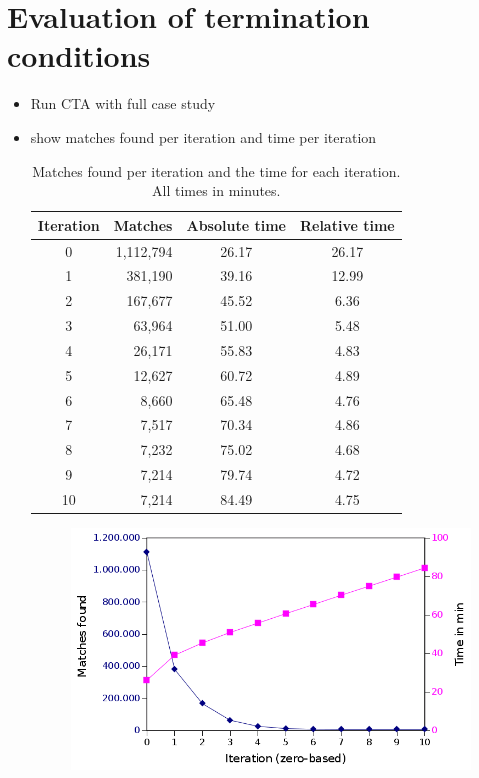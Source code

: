 \section{Evaluation of termination conditions}
\begin{itemize}
	\item Run CTA with full case study
	\item show matches found per iteration and time per iteration

	\begin{table}
		\centering
	\begin{tabular}{|c|r|c|c|}
		  \hline
		  Iteration & Matches & Absolute time& Relative time \\
		  \hline
     		    0  & 1,112,794 & 26.17 & 26.17\\
	            1  & 381,190   & 39.16 & 12.99\\
		    2  & 167,677   & 45.52 & 6.36\\
		    3  & 63,964    & 51.00 & 5.48\\
		    4  & 26,171    & 55.83 & 4.83\\
		    5  & 12,627    & 60.72 & 4.89\\
		    6  & 8,660     & 65.48 & 4.76\\
		    7  & 7,517     & 70.34 & 4.86\\
		    8  & 7,232     & 75.02 & 4.68\\
		    9  & 7,214     & 79.74 & 4.72\\
		    10 & 7,214     & 84.49 & 4.75\\
		  \hline
		   \end{tabular}
		   \caption{Matches found per iteration and the time for each iteration. All times in minutes.}
		   \label{tab:timesandmatchesperiteration}
	\end{table}

	\begin{figure}
		\includegraphics[width=\textwidth]{chapters/casestudy/hasehase.png}
		\caption{}
		\label{fig:hasehase}
	\end{figure}
\end{itemize}

